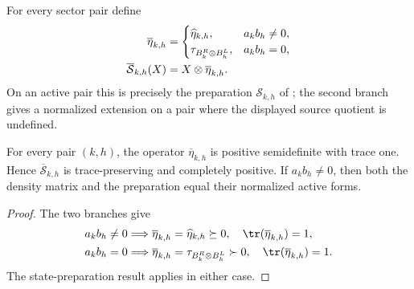 \begin{definition}
    \label{def:mpdo_completed_eta_preparation}
    \leanok
    For every sector pair define
    \begin{align}
        \overline\eta_{k,h}
         & =
        \begin{cases}
            \widehat\eta_{k,h},        & a_kb_h\ne0, \\
            \tau_{B_k^R\otimes B_h^L}, & a_kb_h=0,
        \end{cases} \notag \\
        \overline{\mathcal S}_{k,h}(X)
         & =X\otimes\overline\eta_{k,h}. \notag
    \end{align}
    On an active pair this is precisely the preparation
    $\mathcal S_{k,h}$ of
    \cite[Appendix~C.2, lines~1551--1555]{Cirac2016MPDO_arXiv}; the second
    branch gives a normalized extension on a pair where the displayed source
    quotient is undefined.
\end{definition}

\begin{lemma}
    \label{thm:mpdo_completed_eta_preparation_cptp}
    \leanok
    For every pair $(k,h)$, the operator $\overline\eta_{k,h}$ is positive
    semidefinite with trace one. Hence $\overline{\mathcal S}_{k,h}$ is
    trace-preserving and completely positive. If $a_kb_h\ne0$, then both the
    density matrix and the preparation equal their normalized active forms.
\end{lemma}
\begin{proof}
    \leanok
    The two branches give
    \begin{align}
        a_kb_h\ne0
         & \Longrightarrow
        \overline\eta_{k,h}=\widehat\eta_{k,h}\succeq0,
        \quad \tr(\overline\eta_{k,h})=1, \notag \\
        a_kb_h=0
         & \Longrightarrow
        \overline\eta_{k,h}=\tau_{B_k^R\otimes B_h^L}\succ0,
        \quad \tr(\overline\eta_{k,h})=1. \notag
    \end{align}
    The state-preparation result applies in either case.
\end{proof}

